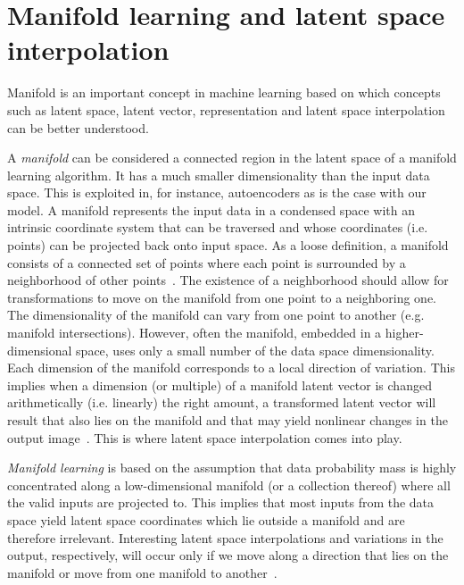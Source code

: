 \documentclass[a4paper,12pt]{report}
\begin{document}


\section{Manifold learning and latent space interpolation}
Manifold is an important concept in machine learning based on which concepts such as latent space, latent vector, representation and latent space interpolation can be better understood. 

A \textit{manifold} can be considered a connected region in the latent space of a manifold learning algorithm. It has a much smaller dimensionality than the input data space. This is exploited in, for instance, autoencoders as is the case with our model. A manifold represents the input data in a condensed space with an intrinsic coordinate system that can be traversed and whose coordinates (i.e. points) can be projected back onto input space. As a loose definition, a manifold consists of a connected set of points where each point is surrounded by a neighborhood of other points~\cite{DeepLearningBook}. The existence of a neighborhood should allow for transformations to move on the manifold from one point to a neighboring one. The dimensionality of the manifold can vary from one point to another (e.g. manifold intersections). However, often the manifold, embedded in a higher-dimensional space, uses only a small number of the data space dimensionality. Each dimension of the manifold corresponds to a local direction of variation. This implies when a dimension (or multiple) of a manifold latent vector is changed arithmetically (i.e. linearly) the right amount, a transformed latent vector will result that also lies on the manifold and that may yield nonlinear changes in the output image~\cite{StyleGAN}. This is where latent space interpolation comes into play. 

\textit{Manifold learning} is based on the assumption that data probability mass is highly concentrated along a low-dimensional manifold (or a collection thereof) where all the valid inputs are projected to. This implies that most inputs from the data space yield latent space coordinates which lie outside a manifold and are therefore irrelevant. Interesting latent space interpolations and variations in the output, respectively, will occur only if we move along a direction that lies on the manifold or move from one manifold to another~\cite{DeepLearningBook}.
\end{document}
